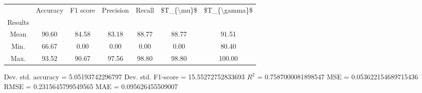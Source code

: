 \begin{tabular}{|c|c|c|c|c|c|c|}
\toprule
{} &  Accuracy &  F1 score &  Precision &  Recall &  \$T\_\{\textbackslash mu\}\$ &  \$T\_\{\textbackslash gamma\}\$ \\
Results &           &           &            &         &            &               \\
\hline
Mean    &     90.60 &     84.58 &      83.18 &   88.77 &      88.77 &         91.51 \\
Min.    &     66.67 &      0.00 &       0.00 &    0.00 &       0.00 &         80.40 \\
Max.    &     93.52 &     90.67 &      97.56 &   98.80 &      98.80 &        100.00 \\
\bottomrule
\end{tabular}

 Dev. std. accuracy = 5.05193742296797
 Dev. std. F1-score = 15.55272752833693
 $R^2$ = 0.7587000081898547
 MSE = 0.053622154689715436
 RMSE = 0.2315645799549565
 MAE = 0.095626455509007